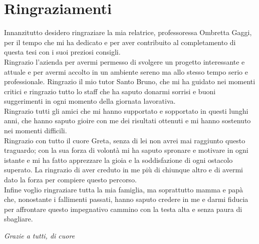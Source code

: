
\bigskip

\begingroup
\let\clearpage\relax
\let\cleardoublepage\relax
\let\cleardoublepage\relax
\chapter*{Ringraziamenti}
Innanzitutto desidero ringraziare la mia relatrice, professoressa Ombretta Gaggi, per il tempo che mi ha dedicato e per aver contribuito al completamento di questa tesi con i suoi preziosi consigli.\\

Ringrazio l'azienda \myCompany per avermi permesso di svolgere un progetto interessante e attuale e per avermi accolto in un ambiente sereno ma allo stesso tempo serio e professionale.
Ringrazio il mio tutor Santo Bruno, che mi ha guidato nei momenti critici e ringrazio tutto lo staff che ha saputo donarmi sorrisi e buoni suggerimenti in ogni momento della giornata lavorativa.\\

Ringrazio tutti gli amici che mi hanno supportato e sopportato in questi lunghi anni, che hanno saputo gioire con me dei risultati ottenuti e mi hanno sostenuto nei momenti difficili.\\

Ringrazio con tutto il cuore Greta, senza di lei non avrei mai raggiunto questo traguardo; con la sua forza di volontà mi ha saputo spronare e motivare in ogni istante e mi ha fatto apprezzare la gioia e la soddisfazione di ogni ostacolo superato. La ringrazio di aver creduto in me più di chiunque altro e di avermi dato la forza per compiere questo percorso.\\

Infine voglio ringraziare tutta la mia famiglia, ma soprattutto mamma e papà che, nonostante i fallimenti passati, hanno saputo credere in me e darmi fiducia per affrontare questo impegnativo cammino con la testa alta e senza paura di sbagliare.

\vspace{2cm}

\begin{center}
\emph{Grazie a tutti, di cuore}
\end{center}

\endgroup



